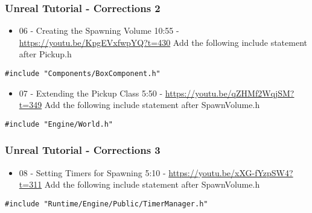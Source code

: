 \begin{frame}[fragile]
\frametitle{Unreal Tutorial - Corrections 2}
\begin{itemize}
	\item 06 - Creating the Spawning Volume 10:55 - \url{https://youtu.be/KpgEVxfwpYQ?t=430} Add the following include statement after Pickup.h
\end{itemize}
\begin{lstlisting}
#include "Components/BoxComponent.h"
\end{lstlisting}
\begin{itemize}
	\item 07 - Extending the Pickup Class 5:50 - \url{https://youtu.be/qZHMf2WqjSM?t=349} Add the following include statement after SpawnVolume.h
\end{itemize}
\begin{lstlisting}
#include "Engine/World.h"
\end{lstlisting}
\end{frame}

\begin{frame}[fragile]
\frametitle{Unreal Tutorial - Corrections 3}
\begin{itemize}
	\item 08 - Setting Timers for Spawning 5:10 - \url{https://youtu.be/xXG-fYzpSW4?t=311} Add the following include statement after SpawnVolume.h
\end{itemize}
\begin{lstlisting}
#include "Runtime/Engine/Public/TimerManager.h"
\end{lstlisting}
\end{frame}

